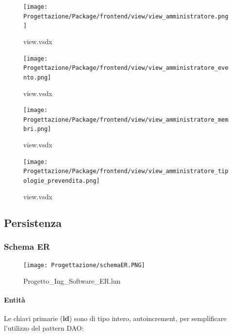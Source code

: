 \documentclass[a4paper]{article}
\begin{document}
\begin{figure}[H]
    \texttt{[image: Progettazione/Package/frontend/view/view\_amministratore.png]}
    \centering
    \caption{view.vsdx}
\end{figure}

\begin{figure}[H]
    \texttt{[image: Progettazione/Package/frontend/view/view\_amministratore\_evento.png]}
    \centering
    \caption{view.vsdx}
\end{figure}

\begin{figure}[H]
    \texttt{[image: Progettazione/Package/frontend/view/view\_amministratore\_membri.png]}
    \centering
    \caption{view.vsdx}
\end{figure}

\begin{figure}[H]
    \texttt{[image: Progettazione/Package/frontend/view/view\_amministratore\_tipologie\_prevendita.png]}
    \centering
    \caption{view.vsdx}
\end{figure}

\newpage

\subsection{Persistenza}

\subsubsection{Schema ER}

\begin{figure}[H]
    \texttt{[image: Progettazione/schemaER.PNG]}
    \centering
    \caption{Progetto\_Ing\_Software\_ER.lun}
\end{figure}

\paragraph{Entità} Le chiavi primarie (\textbf{id}) sono di tipo intero, autoincrement, per semplificare l'utilizzo del pattern DAO:
\end{document}
